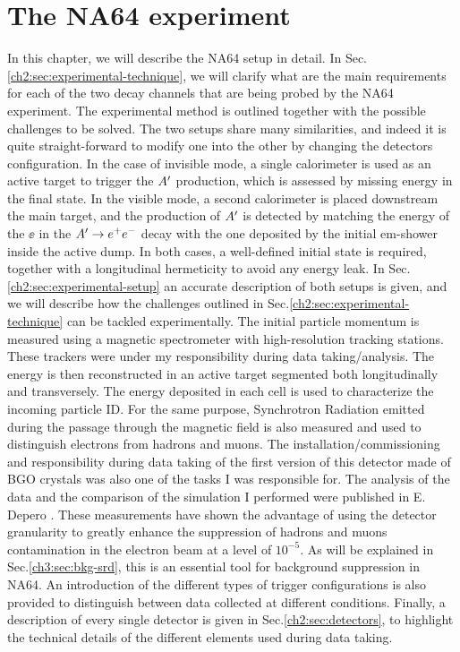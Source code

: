 
\newcommand{\pdirtwo}{chapters/plots/chapter2}

\chapter{The NA64 experiment}

\label{chapter2}


In this chapter, we will describe the NA64 setup in detail. In Sec.\ref{ch2:sec:experimental-technique}, we will clarify what are the main requirements for each of the two decay channels that are being probed by the NA64 experiment. The experimental method is outlined together with the possible challenges to be solved. The two setups share many similarities, and indeed it is quite straight-forward to modify one into the other by changing the detectors configuration. In the case of invisible mode, a single calorimeter is used as an active target to trigger the $A'$ production, which is assessed by missing energy in the final state. In the visible mode, a second calorimeter is placed downstream the main target, and the production of $A'$ is detected by matching the energy of the $\ee$ in the $A' \to e^+e^-$ decay with the one deposited by the initial em-shower inside the active dump. In both cases, a well-defined initial state is required, together with a longitudinal hermeticity to avoid any energy leak. In Sec.\ref{ch2:sec:experimental-setup} an accurate description of both setups is given, and we will describe how the challenges outlined in Sec.\ref{ch2:sec:experimental-technique} can be tackled experimentally. The initial particle momentum is measured using a magnetic spectrometer with high-resolution tracking stations. These trackers were under my responsibility during data taking/analysis. The energy is then reconstructed in an active target segmented both longitudinally and transversely. The energy deposited in each cell is used to characterize the incoming particle ID. For the same purpose, Synchrotron Radiation emitted during the passage through the magnetic field is also measured and used to distinguish electrons from hadrons and muons. The installation/commissioning and responsibility during data taking of the first version of this detector made of BGO crystals was also one of the tasks I was responsible for. The analysis of the data and the comparison of the simulation I performed were published in E. Depero \cite{Depero:2017mrr}. These measurements have shown the advantage of using the detector granularity to greatly enhance the suppression of hadrons and muons contamination in the electron beam at a level of $10^{-5}$. As will be explained in Sec.\ref{ch3:sec:bkg-srd}, this is an essential tool for background suppression in NA64. An introduction of the different types of trigger configurations is also provided to distinguish between data collected at different conditions.
Finally, a description of every single detector is given in Sec.\ref{ch2:sec:detectors}, to highlight the technical details of the different elements used during data taking. 

